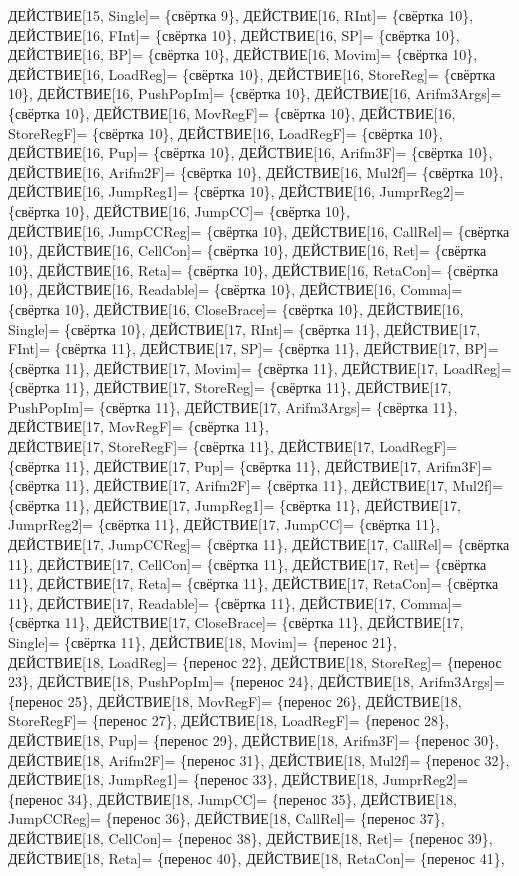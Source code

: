 \documentclass[a0]{a0poster}
\begin{document}
ДЕЙСТВИЕ[15, Single]= \{свёртка 9\}, ДЕЙСТВИЕ[16, RInt]= \{свёртка 10\}, ДЕЙСТВИЕ[16, FInt]= \{свёртка 10\}, ДЕЙСТВИЕ[16, SP]= \{свёртка 10\}, ДЕЙСТВИЕ[16, BP]= \{свёртка 10\}, ДЕЙСТВИЕ[16, Movim]= \{свёртка 10\}, ДЕЙСТВИЕ[16, LoadReg]= \{свёртка 10\}, ДЕЙСТВИЕ[16, StoreReg]= \{свёртка 10\}, ДЕЙСТВИЕ[16, PushPopIm]= \{свёртка 10\}, ДЕЙСТВИЕ[16, Arifm3Args]= \{свёртка 10\}, ДЕЙСТВИЕ[16, MovRegF]= \{свёртка 10\}, ДЕЙСТВИЕ[16, StoreRegF]= \{свёртка 10\}, ДЕЙСТВИЕ[16, LoadRegF]= \{свёртка 10\}, ДЕЙСТВИЕ[16, Pup]= \{свёртка 10\}, ДЕЙСТВИЕ[16, Arifm3F]= \{свёртка 10\}, ДЕЙСТВИЕ[16, Arifm2F]= \{свёртка 10\}, ДЕЙСТВИЕ[16, Mul2f]= \{свёртка 10\}, ДЕЙСТВИЕ[16, JumpReg1]= \{свёртка 10\}, ДЕЙСТВИЕ[16, JumprReg2]= \{свёртка 10\}, ДЕЙСТВИЕ[16, JumpCC]= \{свёртка 10\}, \\
ДЕЙСТВИЕ[16, JumpCCReg]= \{свёртка 10\}, ДЕЙСТВИЕ[16, CallRel]= \{свёртка 10\}, ДЕЙСТВИЕ[16, CellCon]= \{свёртка 10\}, ДЕЙСТВИЕ[16, Ret]= \{свёртка 10\}, ДЕЙСТВИЕ[16, Reta]= \{свёртка 10\}, ДЕЙСТВИЕ[16, RetaCon]= \{свёртка 10\}, ДЕЙСТВИЕ[16, Readable]= \{свёртка 10\}, ДЕЙСТВИЕ[16, Comma]= \{свёртка 10\}, ДЕЙСТВИЕ[16, CloseBrace]= \{свёртка 10\}, ДЕЙСТВИЕ[16, Single]= \{свёртка 10\}, ДЕЙСТВИЕ[17, RInt]= \{свёртка 11\}, ДЕЙСТВИЕ[17, FInt]= \{свёртка 11\}, ДЕЙСТВИЕ[17, SP]= \{свёртка 11\}, ДЕЙСТВИЕ[17, BP]= \{свёртка 11\}, ДЕЙСТВИЕ[17, Movim]= \{свёртка 11\}, ДЕЙСТВИЕ[17, LoadReg]= \{свёртка 11\}, ДЕЙСТВИЕ[17, StoreReg]= \{свёртка 11\}, ДЕЙСТВИЕ[17, PushPopIm]= \{свёртка 11\}, ДЕЙСТВИЕ[17, Arifm3Args]= \{свёртка 11\}, ДЕЙСТВИЕ[17, MovRegF]= \{свёртка 11\}, \\
ДЕЙСТВИЕ[17, StoreRegF]= \{свёртка 11\}, ДЕЙСТВИЕ[17, LoadRegF]= \{свёртка 11\}, ДЕЙСТВИЕ[17, Pup]= \{свёртка 11\}, ДЕЙСТВИЕ[17, Arifm3F]= \{свёртка 11\}, ДЕЙСТВИЕ[17, Arifm2F]= \{свёртка 11\}, ДЕЙСТВИЕ[17, Mul2f]= \{свёртка 11\}, ДЕЙСТВИЕ[17, JumpReg1]= \{свёртка 11\}, ДЕЙСТВИЕ[17, JumprReg2]= \{свёртка 11\}, ДЕЙСТВИЕ[17, JumpCC]= \{свёртка 11\}, ДЕЙСТВИЕ[17, JumpCCReg]= \{свёртка 11\}, ДЕЙСТВИЕ[17, CallRel]= \{свёртка 11\}, ДЕЙСТВИЕ[17, CellCon]= \{свёртка 11\}, ДЕЙСТВИЕ[17, Ret]= \{свёртка 11\}, ДЕЙСТВИЕ[17, Reta]= \{свёртка 11\}, ДЕЙСТВИЕ[17, RetaCon]= \{свёртка 11\}, ДЕЙСТВИЕ[17, Readable]= \{свёртка 11\}, ДЕЙСТВИЕ[17, Comma]= \{свёртка 11\}, ДЕЙСТВИЕ[17, CloseBrace]= \{свёртка 11\}, ДЕЙСТВИЕ[17, Single]= \{свёртка 11\}, ДЕЙСТВИЕ[18, Movim]= \{перенос 21\}, \\
ДЕЙСТВИЕ[18, LoadReg]= \{перенос 22\}, ДЕЙСТВИЕ[18, StoreReg]= \{перенос 23\}, ДЕЙСТВИЕ[18, PushPopIm]= \{перенос 24\}, ДЕЙСТВИЕ[18, Arifm3Args]= \{перенос 25\}, ДЕЙСТВИЕ[18, MovRegF]= \{перенос 26\}, ДЕЙСТВИЕ[18, StoreRegF]= \{перенос 27\}, ДЕЙСТВИЕ[18, LoadRegF]= \{перенос 28\}, ДЕЙСТВИЕ[18, Pup]= \{перенос 29\}, ДЕЙСТВИЕ[18, Arifm3F]= \{перенос 30\}, ДЕЙСТВИЕ[18, Arifm2F]= \{перенос 31\}, ДЕЙСТВИЕ[18, Mul2f]= \{перенос 32\}, ДЕЙСТВИЕ[18, JumpReg1]= \{перенос 33\}, ДЕЙСТВИЕ[18, JumprReg2]= \{перенос 34\}, ДЕЙСТВИЕ[18, JumpCC]= \{перенос 35\}, ДЕЙСТВИЕ[18, JumpCCReg]= \{перенос 36\}, ДЕЙСТВИЕ[18, CallRel]= \{перенос 37\}, ДЕЙСТВИЕ[18, CellCon]= \{перенос 38\}, ДЕЙСТВИЕ[18, Ret]= \{перенос 39\}, ДЕЙСТВИЕ[18, Reta]= \{перенос 40\}, ДЕЙСТВИЕ[18, RetaCon]= \{перенос 41\}, \\
\end{document}
